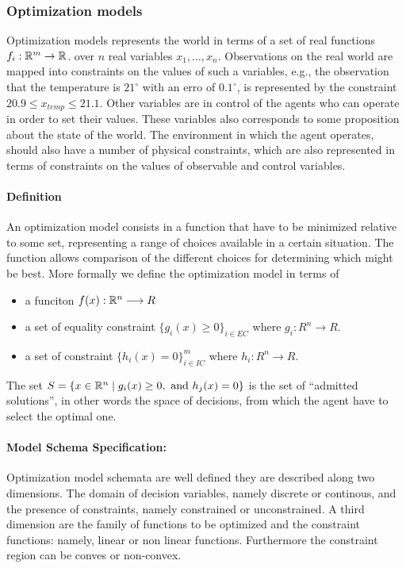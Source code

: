   \subsubsection{Optimization models}
  Optimization models \cite{nocedal2006numerical}
  represents the world in terms of a set of
  real functions $f_i:\mathbb{R}^m \rightarrow \mathbb{R}$. over $n$ real variables
  $x_1,\dots,x_n$. Observations on the real world are mapped into
  constraints on the values of such a variables, e.g., the observation
  that the temperature is $21^\circ$ with an erro of $0.1^\circ$, is
  represented by the constraint $20.9\leq x_{temp}\leq 21.1$. Other
  variables are in control of the agents who can operate in order to
  set their values. These variables also corresponds to some
  proposition about the state of the world. The environment in which
  the agent operates, should also have a number of physical
  constraints, which are also represented in terms of constraints on
  the values of observable and control variables. 

  \paragraph{Definition}
  An optimization model consists in a 
  function that have to be minimized relative to some set, representing a range of choices
  available in a certain situation. The function allows comparison
  of the different choices for determining which might be best.  More
  formally we define the optimization model in terms of
  \begin{itemize}
  \item a funciton $f(x):\mathbb{R}^n\longrightarrow R$
  \item a set of equality constraint $\{g_i(x) \geq 0\}_{i\in EC}$ where
    $g_i:R^n\longrightarrow R$.
  \item a set of constraint $\{h_i(x) = 0\}_{i\in IC}^m$ where
    $h_i:R^n\longrightarrow R$. 
  \end{itemize}
  The set $S=\{x\in\mathbb{R}^{n}\mid g_i(x) \geq 0, \mbox{ and } h_j(x)=0\}$
  is the set of ``admitted solutions'', in other words the space of
  decisions, from which the agent have to select the optimal one. 
  
  \paragraph{Model Schema Specification:}
  Optimization model schemata are well defined they are described
  along two dimensions. The domain of decision variables, namely
  discrete or continous, and the presence of constraints, namely
  constrained or unconstrained. A third dimension are the family of
  functions to be optimized and the constraint functions: namely,
  linear or non linear functions. Furthermore the constraint region
  can be conves or non-convex. 

